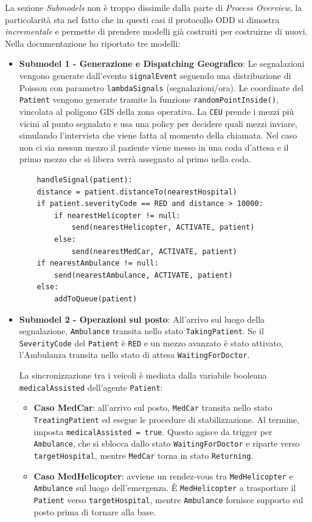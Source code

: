 \documentclass[12pt,a4paper,oneside]{article}
\begin{document}
La sezione \textit{Submodels} non è troppo dissimile dalla parte di \textit{Process Overview}, la particolarità sta nel fatto che
in questi casi il protocollo ODD si dimostra \textit{incrementale} e permette di prendere modelli già costruiti per costruirne di nuovi.
Nella documentazione ho riportato tre modelli:
\begin{itemize}
    \item \textbf{Submodel 1 - Generazione e Dispatching Geografico}: Le segnalazioni vengono generate dall'evento \texttt{signalEvent} seguendo
    una distribuzione di Poisson con parametro \texttt{lambdaSignals} (segnalazioni/ora).
    Le coordinate del \texttt{Patient} vengono generate tramite la funzione
    \texttt{randomPointInside()}, vincolata al poligono GIS della zona operativa.
    La \texttt{CEU} prende i mezzi più vicini al punto segnalato e usa una policy
    per decidere quali mezzi inviare, simulando l'intervista che viene fatta al momento della chiamata.
    Nel caso non ci sia nessun mezzo il paziente viene messo in una coda d'attesa e
    il primo mezzo che si libera verrà assegnato al primo nella coda. 
    \begin{verbatim}
    handleSignal(patient):
    distance = patient.distanceTo(nearestHospital)
    if patient.severityCode == RED and distance > 10000:
        if nearestHelicopter != null:
            send(nearestHelicopter, ACTIVATE, patient)
        else:
            send(nearestMedCar, ACTIVATE, patient)
    if nearestAmbulance != null:
        send(nearestAmbulance, ACTIVATE, patient)
    else:
        addToQueue(patient)
    \end{verbatim}

    \item \textbf{Submodel 2 - Operazioni sul posto}: All'arrivo sul luogo della segnalazione, \texttt{Ambulance} transita nello
    stato \texttt{TakingPatient}. Se il \texttt{SeverityCode} del \texttt{Patient}
    è \texttt{RED} e un mezzo avanzato è stato attivato, l'Ambulanza transita
    nello stato di attesa \texttt{WaitingForDoctor}.

    La sincronizzazione tra i veicoli è mediata dalla variabile booleana
    \texttt{medicalAssisted} dell'agente \texttt{Patient}:

    \begin{itemize}
        \item \textbf{Caso MedCar}: all'arrivo sul posto, \texttt{MedCar} transita
        nello stato \texttt{TreatingPatient} ed esegue le procedure di stabilizzazione.
        Al termine, imposta \texttt{medicalAssisted = true}. Questo agisce da trigger
        per \texttt{Ambulance}, che si sblocca dallo stato \texttt{WaitingForDoctor}
        e riparte verso \texttt{targetHospital}, mentre \texttt{MedCar} torna in
        stato \texttt{Returning}.
        \item \textbf{Caso MedHelicopter}: avviene un rendez-vous tra
        \texttt{MedHelicopter} e \texttt{Ambulance} sul luogo dell'emergenza.
        È \texttt{MedHelicopter} a trasportare il \texttt{Patient} verso
        \texttt{targetHospital}, mentre \texttt{Ambulance} fornisce supporto
        sul posto prima di tornare alla base.
    \end{itemize}


\end{itemize}
\end{document}
